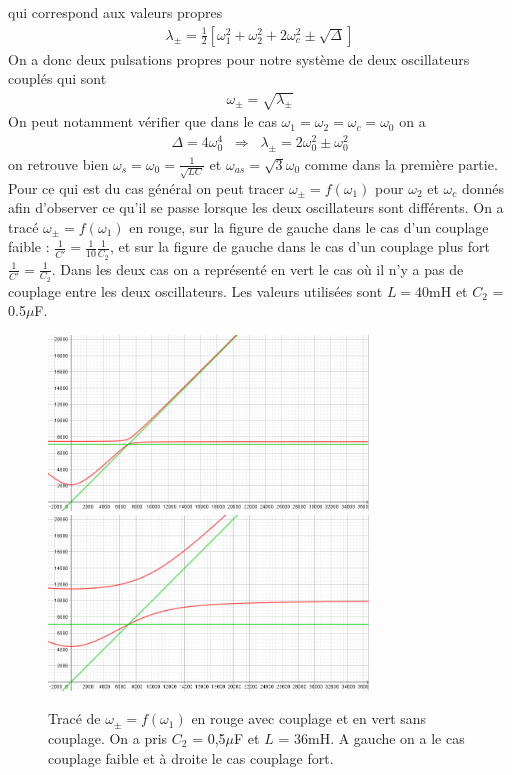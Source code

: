 \documentclass[12pt,prb,aps,epsf]{article}
\begin{document}
qui correspond aux valeurs propres 
\begin{eqnarray}
\lambda_{\pm} = \frac{1}{2}\left[\omega_1^2  +\omega_2^2 + 2\omega_c^2 \pm \sqrt{\Delta}\right]
\end{eqnarray}
On a donc deux pulsations propres pour notre système de deux oscillateurs couplés qui sont 
\begin{eqnarray}
\omega_{\pm} = \sqrt{\lambda_{\pm}}
\end{eqnarray}
On peut notamment vérifier que dans le cas $\omega_1=\omega_2=\omega_c = \omega_0$ on a 
\begin{eqnarray}
\Delta = 4\omega_0^4 \;\;\Longrightarrow\;\; \lambda_{\pm} = 2\omega_0^2 \pm \omega_0^2
\end{eqnarray}
on retrouve bien $\omega_s= \omega_0 = \frac{1}{\sqrt{LC}}$ et $\omega_{as} = \sqrt{3}\omega_0$ comme dans la première partie. \\

Pour ce qui est du cas général on peut tracer $\omega_{\pm} = f(\omega_1)$ pour $\omega_2$ et $\omega_c$ donnés afin d'observer ce qu'il se passe lorsque les deux oscillateurs sont différents. On a tracé $\omega_{\pm} = f(\omega_1)$ en rouge, sur la figure de gauche dans le cas d'un couplage faible : $\frac{1}{C'} = \frac{1}{10}\frac{1}{C_2}$, et sur la figure de gauche dans le cas d'un couplage plus fort $\frac{1}{C'} = \frac{1}{C_2}$. Dans les deux cas on a représenté en vert le cas où il n'y a pas de couplage entre les deux oscillateurs. Les valeurs utilisées sont $L=40$mH et $C_2$ = 0.5$\mu$F.
\begin{figure}[h]
	\centering \includegraphics[width=8.5cm]{couplage_faible} \includegraphics[width=8.5cm]{couplage_fort}
	\caption{Tracé de $\omega_{\pm} = f(\omega_1)$ en rouge avec couplage et en vert sans couplage. On a pris $C_2$ = 0,5$\mu$F et $L$ = 36mH. A gauche on a le cas couplage faible et à droite le cas couplage fort.}
\end{figure}
\end{document}
